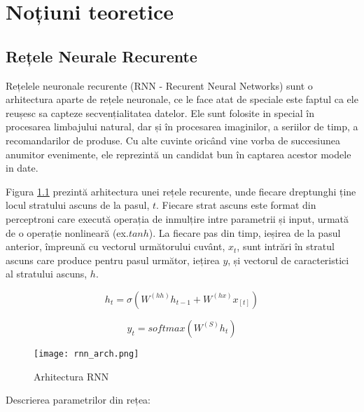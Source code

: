\chapter{Noțiuni teoretice}

\section{Rețele Neurale Recurente}

Rețelele neuronale recurente (RNN - Recurent Neural Networks) sunt o arhitectura aparte de rețele neuronale, ce le face atat de speciale este faptul ca ele reușesc sa capteze secvențialitatea datelor. Ele sunt folosite in special în procesarea limbajului natural, dar și în procesarea imaginilor, a seriilor de timp, a recomandarilor de produse. Cu alte cuvinte oricând vine vorba de succesiunea anumitor evenimente, ele reprezintă un candidat bun în captarea acestor modele in date.

Figura \ref{fig:rnn_arch} prezintă arhitectura unei rețele recurente, unde fiecare dreptunghi ține locul stratului ascuns de la pasul, $t$. Fiecare strat ascuns este format din perceptroni care execută operația de inmulțire intre parametrii și input, urmată de o operație nonlineară (ex.$ tanh$). La fiecare pas din timp, ieșirea de la pasul anterior, împreună cu vectorul următorului cuvânt, $x_t$, sunt intrări în stratul ascuns care produce pentru pasul următor, iețirea $y$, și vectorul de caracteristici al stratului ascuns, $h$.


\begin{equation}
	h_t = \sigma{(W^{(hh)} h_{t-1} + W^{(hx)} x_{[t]})}
	\label{h_t}
\end{equation}

\begin{equation}
	y_t = softmax(W^{(S)} h_t) 
	\label{y_t}
\end{equation}

\begin{figure}[h]
	\centering
	\texttt{[image: rnn\_arch.png]}
	\caption{Arhitectura RNN \cite{cs224d_notes}}
	\label{fig:rnn_arch}
\end{figure}

Descrierea parametrilor din rețea:

